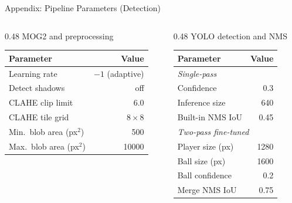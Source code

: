 \begin{frame}{Appendix: Pipeline Parameters (Detection)}
\scriptsize
\begin{columns}[T]
  \begin{column}{0.48\textwidth}
    \centering MOG2 and preprocessing\\[2pt]
    \begin{tabular}{lr}
      \toprule
      Parameter & Value \\
      \midrule
      Learning rate            & $-1$ (adaptive) \\
      Detect shadows           & off \\
      CLAHE clip limit         & 6.0 \\
      CLAHE tile grid          & $8\times8$ \\
      Min.\ blob area (px$^2$) & 500 \\
      Max.\ blob area (px$^2$) & 10000 \\
      \bottomrule
    \end{tabular}
  \end{column}
  \begin{column}{0.48\textwidth}
    \centering YOLO detection and NMS\\[2pt]
    \begin{tabular}{lr}
      \toprule
      Parameter & Value \\
      \midrule
      \multicolumn{2}{l}{\textit{Single-pass}} \\
      \quad Confidence       & 0.3 \\
      \quad Inference size   & 640 \\
      \quad Built-in NMS IoU & 0.45 \\
      \multicolumn{2}{l}{\textit{Two-pass fine-tuned}} \\
      \quad Player size (px) & 1280 \\
      \quad Ball size (px)   & 1600 \\
      \quad Ball confidence  & 0.2 \\
      \quad Merge NMS IoU    & 0.75 \\
      \bottomrule
    \end{tabular}
  \end{column}
\end{columns}
\end{frame}

